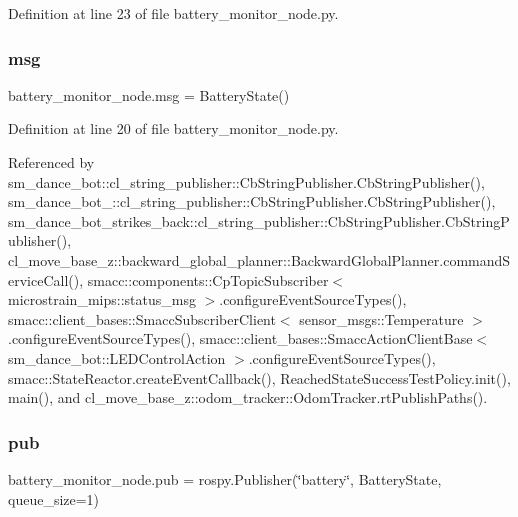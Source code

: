 Definition at line 23 of file battery\+\_\+monitor\+\_\+node.\+py.

\mbox{\label{namespacebattery__monitor__node_ab1920c64448816edd4064e494275fdff}} 
\subsubsection{\texorpdfstring{msg}{msg}}
{\footnotesize\ttfamily battery\+\_\+monitor\+\_\+node.\+msg = Battery\+State()}



Definition at line 20 of file battery\+\_\+monitor\+\_\+node.\+py.



Referenced by sm\+\_\+dance\+\_\+bot\+::cl\+\_\+string\+\_\+publisher\+::\+Cb\+String\+Publisher.\+Cb\+String\+Publisher(), sm\+\_\+dance\+\_\+bot\+\_\+::cl\+\_\+string\+\_\+publisher\+::\+Cb\+String\+Publisher.\+Cb\+String\+Publisher(), sm\+\_\+dance\+\_\+bot\+\_\+strikes\+\_\+back\+::cl\+\_\+string\+\_\+publisher\+::\+Cb\+String\+Publisher.\+Cb\+String\+Publisher(), cl\+\_\+move\+\_\+base\+\_\+z\+::backward\+\_\+global\+\_\+planner\+::\+Backward\+Global\+Planner.\+command\+Service\+Call(), smacc\+::components\+::\+Cp\+Topic\+Subscriber$<$ microstrain\+\_\+mips\+::status\+\_\+msg $>$.\+configure\+Event\+Source\+Types(), smacc\+::client\+\_\+bases\+::\+Smacc\+Subscriber\+Client$<$ sensor\+\_\+msgs\+::\+Temperature $>$.\+configure\+Event\+Source\+Types(), smacc\+::client\+\_\+bases\+::\+Smacc\+Action\+Client\+Base$<$ sm\+\_\+dance\+\_\+bot\+::\+L\+E\+D\+Control\+Action $>$.\+configure\+Event\+Source\+Types(), smacc\+::\+State\+Reactor.\+create\+Event\+Callback(), Reached\+State\+Success\+Test\+Policy.\+init(), main(), and cl\+\_\+move\+\_\+base\+\_\+z\+::odom\+\_\+tracker\+::\+Odom\+Tracker.\+rt\+Publish\+Paths().

\mbox{\label{namespacebattery__monitor__node_ab13957b56951b692f19d70ccac2e2511}} 
\subsubsection{\texorpdfstring{pub}{pub}}
{\footnotesize\ttfamily battery\+\_\+monitor\+\_\+node.\+pub = rospy.\+Publisher(\char`\"{}battery\char`\"{}, Battery\+State, queue\+\_\+size=1)}



